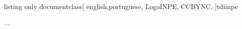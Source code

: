\begin{texexp}{listing only}
documentclass[
english,portuguese, 
LogoINPE,
CCBYNC,
]{tdiinpe}


...
\end{texexp}

